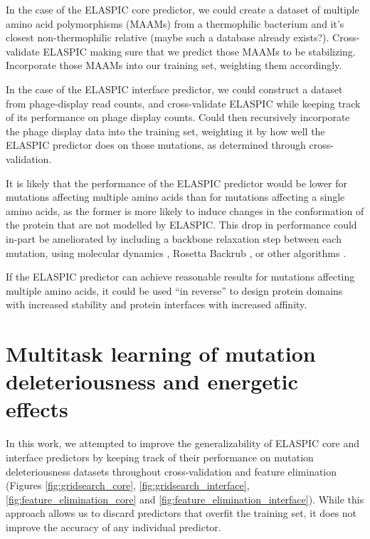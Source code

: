 In the case of the ELASPIC core predictor, we could create a dataset of multiple amino acid polymorphisms (MAAMs) from a thermophilic bacterium and it's closest non-thermophilic relative (maybe such a database already exists?). Cross-validate ELASPIC making sure that we predict those MAAMs to be stabilizing. Incorporate those MAAMs into our training set, weighting them accordingly.

In the case of the ELASPIC interface predictor, we could construct a dataset from phage-display read counts, and cross-validate ELASPIC while keeping track of its performance on phage display counts. Could then recursively incorporate the phage display data into the training set, weighting it by how well the ELASPIC predictor does on those mutations, as determined through cross-validation.

It is likely that the performance of the ELASPIC predictor would be lower for mutations affecting multiple amino acids than for mutations affecting a single amino acids, as the former is more likely to induce changes in the conformation of the protein that are not modelled by ELASPIC. This drop in performance could in-part be ameliorated by including a backbone relaxation step between each mutation, using molecular dynamics \cite{abraham_gromacs:_2015}, Rosetta Backrub \cite{smith_predicting_2011}, or other algorithms \cite{sun_protein_2016}.

If the ELASPIC predictor can achieve reasonable results for mutations affecting multiple amino acids, it could be used ``in reverse'' to design protein domains with increased stability and protein interfaces with increased affinity.



\section{Multitask learning of mutation deleteriousness and energetic effects} \label{sec:better_features}

In this work, we attempted to improve the generalizability of ELASPIC core and interface predictors by keeping track of their performance on mutation deleteriousness datasets throughout cross-validation and feature elimination (Figures \ref{fig:gridsearch_core}, \ref{fig:gridsearch_interface}, \ref{fig:feature_elimination_core} and \ref{fig:feature_elimination_interface}). While this approach allows us to discard predictors that overfit the training set, it does not improve the accuracy of any individual predictor.

